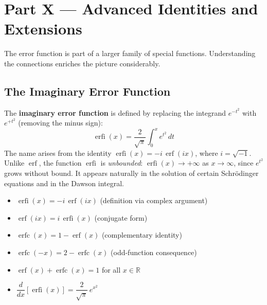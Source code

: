 \documentclass[11pt]{article}
\begin{document}
\clearpage
{}
{}
\section*{Part X --- Advanced Identities and Extensions}
\setcounter{section}{10}

The error function is part of a larger family of special functions. Understanding the connections enriches the picture considerably.

\subsection{The Imaginary Error Function}

\begin{defnbox}
The \textbf{imaginary error function} is defined by replacing the integrand $e^{-t^2}$ with $e^{+t^2}$ (removing the minus sign):
\[
\operatorname{erfi}(x) = \frac{2}{\sqrt{\pi}}\int_{0}^{x} e^{t^2}\,dt
\]
The name arises from the identity $\operatorname{erfi}(x) = -i\,\operatorname{erf}(ix)$, where $i = \sqrt{-1}$. Unlike $\operatorname{erf}$, the function $\operatorname{erfi}$ is \textit{unbounded}: $\operatorname{erfi}(x) \to +\infty$ as $x \to \infty$, since $e^{t^2}$ grows without bound. It appears naturally in the solution of certain Schr\"{o}dinger equations and in the Dawson integral.
\end{defnbox}

\begin{theorembox}
\begin{itemize}[leftmargin=1.5em, itemsep=4pt]
    \item $\operatorname{erfi}(x) = -i\,\operatorname{erf}(ix)$ \hfill (definition via complex argument)
    \item $\operatorname{erf}(ix) = i\,\operatorname{erfi}(x)$ \hfill (conjugate form)
    \item $\operatorname{erfc}(x) = 1 - \operatorname{erf}(x)$ \hfill (complementary identity)
    \item $\operatorname{erfc}(-x) = 2 - \operatorname{erfc}(x)$ \hfill (odd-function consequence)
    \item $\operatorname{erf}(x) + \operatorname{erfc}(x) = 1$ for all $x \in \mathbb{R}$
    \item $\dfrac{d}{dx}[\operatorname{erfi}(x)] = \dfrac{2}{\sqrt{\pi}}\,e^{x^2}$
\end{itemize}
\end{theorembox}
\end{document}

